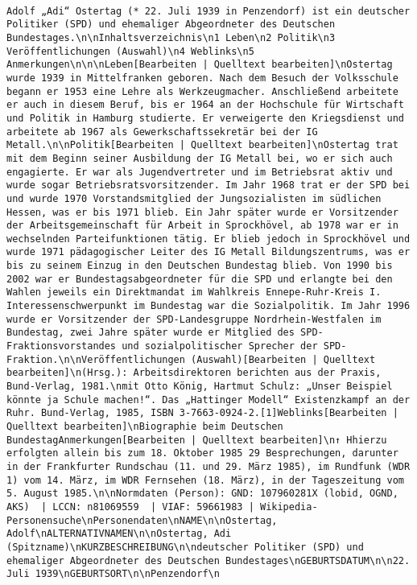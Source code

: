 \documentclass[
]{article}
\begin{document}
\begin{verbatim}
                                                                                                                                                                                                       Adolf „Adi“ Ostertag (* 22. Juli 1939 in Penzendorf) ist ein deutscher Politiker (SPD) und ehemaliger Abgeordneter des Deutschen Bundestages.\n\nInhaltsverzeichnis\n1 Leben\n2 Politik\n3 Veröffentlichungen (Auswahl)\n4 Weblinks\n5 Anmerkungen\n\n\nLeben[Bearbeiten | Quelltext bearbeiten]\nOstertag wurde 1939 in Mittelfranken geboren. Nach dem Besuch der Volksschule begann er 1953 eine Lehre als Werkzeugmacher. Anschließend arbeitete er auch in diesem Beruf, bis er 1964 an der Hochschule für Wirtschaft und Politik in Hamburg studierte. Er verweigerte den Kriegsdienst und arbeitete ab 1967 als Gewerkschaftssekretär bei der IG Metall.\n\nPolitik[Bearbeiten | Quelltext bearbeiten]\nOstertag trat mit dem Beginn seiner Ausbildung der IG Metall bei, wo er sich auch engagierte. Er war als Jugendvertreter und im Betriebsrat aktiv und wurde sogar Betriebsratsvorsitzender. Im Jahr 1968 trat er der SPD bei und wurde 1970 Vorstandsmitglied der Jungsozialisten im südlichen Hessen, was er bis 1971 blieb. Ein Jahr später wurde er Vorsitzender der Arbeitsgemeinschaft für Arbeit in Sprockhövel, ab 1978 war er in wechselnden Parteifunktionen tätig. Er blieb jedoch in Sprockhövel und wurde 1971 pädagogischer Leiter des IG Metall Bildungszentrums, was er bis zu seinem Einzug in den Deutschen Bundestag blieb. Von 1990 bis 2002 war er Bundestagsabgeordneter für die SPD und erlangte bei den Wahlen jeweils ein Direktmandat im Wahlkreis Ennepe-Ruhr-Kreis I. Interessenschwerpunkt im Bundestag war die Sozialpolitik. Im Jahr 1996 wurde er Vorsitzender der SPD-Landesgruppe Nordrhein-Westfalen im Bundestag, zwei Jahre später wurde er Mitglied des SPD-Fraktionsvorstandes und sozialpolitischer Sprecher der SPD-Fraktion.\n\nVeröffentlichungen (Auswahl)[Bearbeiten | Quelltext bearbeiten]\n(Hrsg.): Arbeitsdirektoren berichten aus der Praxis, Bund-Verlag, 1981.\nmit Otto König, Hartmut Schulz: „Unser Beispiel könnte ja Schule machen!“. Das „Hattinger Modell“ Existenzkampf an der Ruhr. Bund-Verlag, 1985, ISBN 3-7663-0924-2.[1]Weblinks[Bearbeiten | Quelltext bearbeiten]\nBiographie beim Deutschen BundestagAnmerkungen[Bearbeiten | Quelltext bearbeiten]\n↑ Hhierzu erfolgten allein bis zum 18. Oktober 1985 29 Besprechungen, darunter in der Frankfurter Rundschau (11. und 29. März 1985), im Rundfunk (WDR 1) vom 14. März, im WDR Fernsehen (18. März), in der Tageszeitung vom 5. August 1985.\n\nNormdaten (Person): GND: 107960281X (lobid, OGND, AKS)  | LCCN: n81069559  | VIAF: 59661983 | Wikipedia-Personensuche\nPersonendaten\nNAME\n\nOstertag, Adolf\nALTERNATIVNAMEN\n\nOstertag, Adi (Spitzname)\nKURZBESCHREIBUNG\n\ndeutscher Politiker (SPD) und ehemaliger Abgeordneter des Deutschen Bundestages\nGEBURTSDATUM\n\n22. Juli 1939\nGEBURTSORT\n\nPenzendorf\n
\end{verbatim}
\end{document}
